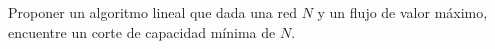 

\item Proponer un algoritmo lineal que dada una red $N$ y un flujo de valor máximo, encuentre un corte de capacidad mínima de $N$.

